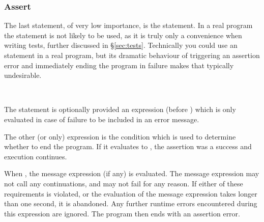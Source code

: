 \subsubsection{Assert}

The last statement, of very low importance, is the  statement.
In a real program the  statement is not likely to be used, as
it is truly only a convenience when writing tests, further discussed in
\S\ref{sec:tests}. Technically you could use an  statement
in a real program, but its dramatic behaviour of triggering an assertion error
and immediately ending the program in failure makes that typically undesirable.

\begin{bnf*}
     \\
\end{bnf*}

The  statement is optionally provided an expression (before )
which is only evaluated in case of failure to be included in an error message.

The other (or only) expression is the condition which is used to determine
whether to end the program. If it evaluates to , the assertion was
a success and execution continues.

When , the message expression (if any) is evaluated. The message
expression may not call any continuations, and may not fail for any reason.
If either of these requirements is violated, or the evaluation of the
message expression takes longer than one second, it is abandoned. Any further
runtime errors encountered during this expression are ignored. The program
then ends with an assertion error.

\begin{prooftree}
\end{prooftree}

\begin{prooftree}
\end{prooftree}
